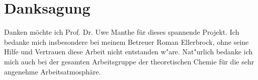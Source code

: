 \chapter{Danksagung}
Danken m\"ochte ich Prof. Dr. Uwe Manthe f\"ur dieses spannende Projekt.
Ich bedanke mich insbesondere bei meinem Betreuer Roman Ellerbrock, ohne seine Hilfe und Vertrauen 
diese Arbeit nicht entstanden w"are. 
Nat"urlich bedanke ich mich auch bei der gesamten Arbeitsgruppe der theoretischen Chemie f\"ur die sehr angenehme Arbeitsatmosph\"are.

